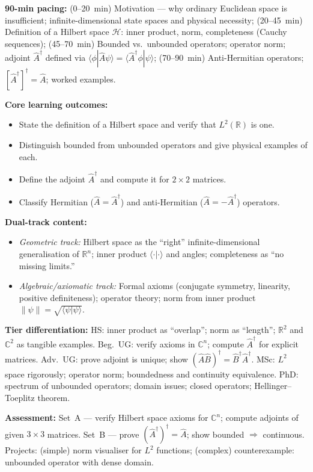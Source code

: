 \documentclass[11pt,a4paper]{article}
\begin{document}
\begin{tcolorbox}[modulebox, title={Module~I.1 --- Lecture L01: The Hilbert Space of Quantum States}]
\textbf{90-min pacing:} (0--20~min) Motivation --- why ordinary Euclidean space is insufficient;
infinite-dimensional state spaces and physical necessity;
(20--45~min) Definition of a Hilbert space $\mathcal{H}$: inner product, norm, completeness (Cauchy sequences);
(45--70~min) Bounded vs.\ unbounded operators; operator norm; adjoint $\hat{A}^\dagger$ defined via
$\langle\phi|\hat{A}\psi\rangle = \langle\hat{A}^\dagger\phi|\psi\rangle$;
(70--90~min) Anti-Hermitian operators; $[\hat{A}^\dagger]^\dagger=\hat{A}$; worked examples.

\medskip\textbf{Core learning outcomes:}
\begin{itemize}[leftmargin=1.4em,topsep=2pt,itemsep=1pt]
  \item State the definition of a Hilbert space and verify that $L^2(\mathbb{R})$ is one.
  \item Distinguish bounded from unbounded operators and give physical examples of each.
  \item Define the adjoint $\hat{A}^\dagger$ and compute it for $2\times 2$ matrices.
  \item Classify Hermitian ($\hat{A}=\hat{A}^\dagger$) and anti-Hermitian ($\hat{A}=-\hat{A}^\dagger$) operators.
\end{itemize}

\medskip\textbf{Dual-track content:}
\begin{itemize}[leftmargin=1.4em,topsep=2pt,itemsep=1pt]
  \item \textit{Geometric track:} Hilbert space as the ``right'' infinite-dimensional generalisation
    of $\mathbb{R}^n$; inner product $\langle\cdot|\cdot\rangle$ and angles; completeness as
    ``no missing limits.''
  \item \textit{Algebraic/axiomatic track:} Formal axioms (conjugate symmetry, linearity, positive
    definiteness); operator theory; norm from inner product $\|\psi\|=\sqrt{\langle\psi|\psi\rangle}$.
\end{itemize}

\medskip\textbf{Tier differentiation:}
HS: inner product as ``overlap''; norm as ``length''; $\mathbb{R}^2$ and $\mathbb{C}^2$ as tangible examples.
Beg.\ UG: verify axioms in $\mathbb{C}^n$; compute $\hat{A}^\dagger$ for explicit matrices.
Adv.\ UG: prove adjoint is unique; show $(\hat{A}\hat{B})^\dagger = \hat{B}^\dagger\hat{A}^\dagger$.
MSc: $L^2$ space rigorously; operator norm; boundedness and continuity equivalence.
PhD: spectrum of unbounded operators; domain issues; closed operators; Hellinger--Toeplitz theorem.

\medskip\textbf{Assessment:}
Set~A --- verify Hilbert space axioms for $\mathbb{C}^n$; compute adjoints of given $3\times 3$ matrices.
Set~B --- prove $(\hat{A}^\dagger)^\dagger = \hat{A}$; show bounded $\Rightarrow$ continuous.
Projects: (simple) norm visualiser for $L^2$ functions; (complex) counterexample: unbounded operator with dense domain.
\end{tcolorbox}
\end{document}
